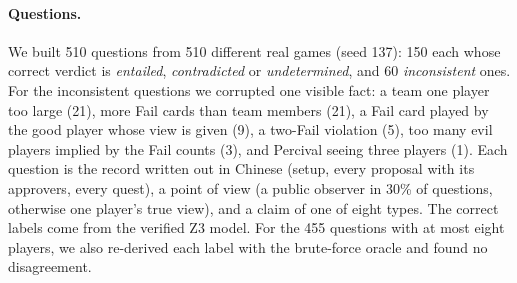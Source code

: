 \documentclass[runningheads]{llncs}
\newcommand{\vd}[1]{\emph{#1}}             %
\begin{document}
\paragraph{Questions.}
We built 510 questions from 510 different real games (seed 137): 150 each whose correct verdict is \vd{entailed},
\vd{contradicted} or \vd{undetermined}, and 60 \vd{inconsistent} ones. For the inconsistent questions we corrupted one
visible fact: a team one player too large (21), more Fail cards than team members (21), a Fail card played by the good
player whose view is given (9), a two-Fail violation (5), too many evil players implied by the Fail counts (3), and
Percival seeing three players (1). Each question is the record written out in Chinese (setup, every proposal with its
approvers, every quest), a point of view (a public observer in 30\% of questions, otherwise one player's true view),
and a claim of one of eight types. The correct labels come from the verified Z3 model. For the 455 questions with at
most eight players, we also re-derived each label with the brute-force oracle and found no disagreement.
\end{document}
